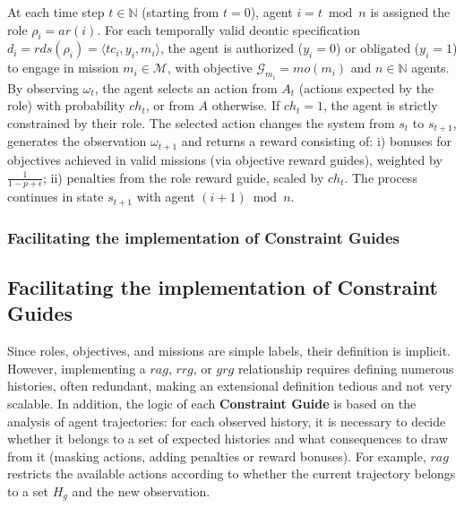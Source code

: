 At each time step $t \in \mathbb{N}$ (starting from $t=0$), agent $i = t \bmod n$ is assigned the role $\rho_i = ar(i)$. For each temporally valid deontic specification $d_i = rds(\rho_i) = \langle tc_i, y_i, m_i \rangle$, the agent is authorized ($y_i = 0$) or obligated ($y_i = 1$) to engage in mission $m_i \in \mathcal{M}$, with objective $\mathcal {G}_{m_i} = mo(m_i)$ and $n \in \mathbb{N}$ agents.
%
By observing $\omega_t$, the agent selects an action from $A_t$ (actions expected by the role) with probability $ch_t$, or from $A$ otherwise. If $ch_t = 1$, the agent is strictly constrained by their role.
%
The selected action changes the system from $s_t$ to $s_{t+1}$, generates the observation $\omega_{t+1}$ and returns a reward consisting of:
i) bonuses for objectives achieved in valid missions (via objective reward guides), weighted by $\frac{1}{1 - p + \epsilon}$;
ii) penalties from the role reward guide, scaled by $ch_t$.
%
The process continues in state $s_{t+1}$ with agent $(i + 1) \bmod n$.

\subsubsection*{Facilitating the implementation of \textbf{Constraint Guides}}
\subsection{Facilitating the implementation of \textbf{Constraint Guides}}

Since roles, objectives, and missions are simple labels, their definition is implicit. However, implementing a \(rag\), \(rrg\), or \(grg\) relationship requires defining numerous histories, often redundant, making an extensional definition tedious and not very scalable. In addition, the logic of each \textbf{Constraint Guide} is based on the analysis of agent trajectories: for each observed history, it is necessary to decide whether it belongs to a set of expected histories and what consequences to draw from it (masking actions, adding penalties or reward bonuses). For example, \(rag\) restricts the available actions according to whether the current trajectory belongs to a set \(H_g\) and the new observation.

